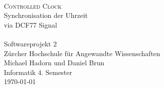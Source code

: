 
\begin{titlepage}
 	\mbox{}\vspace{5\baselineskip}\\
 	\sffamily\huge
 	\centering
 	\textsc{Controlled Clock} \\[2ex]
    Synchronisation der Uhrzeit\\
    via DCF77 Signal
    \rmfamily\Large
    \vspace{1\baselineskip}\\
    \mbox{}
    \vspace{3\baselineskip}\\
 	\rmfamily\Large
 	Softwareprojekt 2 \\ Zürcher Hochschule für Angewandte Wissenschaften
 	\vspace{2\baselineskip}\\
 	\rmfamily\Large
 	Michael Hadorn und Daniel Brun\\
 	Informatik 4. Semester
 	\vspace{1\baselineskip}\\
 	\today
\end{titlepage}